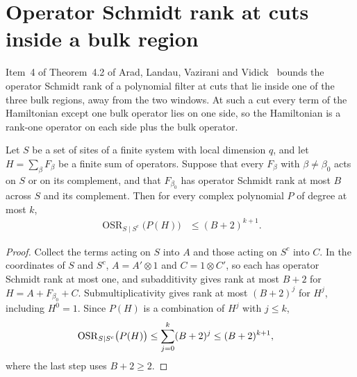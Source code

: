 \chapter{Operator Schmidt rank at cuts inside a bulk region}
\label{ch:alvv_interior_cut_rank}

Item~4 of Theorem~4.2 of Arad, Landau, Vazirani and
Vidick~\cite{Arad2016RigorousRG} bounds the operator Schmidt rank of a
polynomial filter at cuts that lie inside one of the three bulk regions,
away from the two windows. At such a cut every term of the Hamiltonian
except one bulk operator lies on one side, so the Hamiltonian is a rank-one
operator on each side plus the bulk operator.

\begin{lemma}
    \label{thm:alvv_bulk_cut_polynomial_rank}
    \leanok
    Let $S$ be a set of sites of a finite system with local dimension $q$,
    and let $H=\sum_\beta F_\beta$ be a finite sum of operators. Suppose that
    every $F_\beta$ with $\beta\ne\beta_0$ acts on $S$ or on its complement,
    and that $F_{\beta_0}$ has operator Schmidt rank at most $B$ across
    $S$ and its complement. Then for every complex polynomial $P$ of degree
    at most $k$,
    \begin{align}
        \operatorname{OSR}_{S\mid S^c}\bigl(P(H)\bigr)
         & \le(B+2)^{k+1}.
        \label{eq:alvv_bulk_cut_polynomial_rank}
    \end{align}
\end{lemma}
\begin{proof}\leanok
    Collect the terms acting on $S$ into $A$ and those acting on $S^c$ into
    $C$. In the coordinates of $S$ and $S^c$, $A=A'\otimes1$ and
    $C=1\otimes C'$, so each has operator Schmidt rank at most one, and
    subadditivity gives rank at most $B+2$ for $H=A+F_{\beta_0}+C$.
    Submultiplicativity gives rank at most $(B+2)^j$ for $H^j$, including
    $H^0=1$. Since $P(H)$ is a combination of $H^j$ with $j\le k$,
    \begin{align}
        \operatorname{OSR}_{S\mid S^c}\bigl(P(H)\bigr)
         & \le\sum_{j=0}^k(B+2)^j\le(B+2)^{k+1},\notag
    \end{align}
    where the last step uses $B+2\ge2$.
\end{proof}

